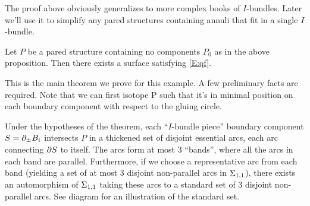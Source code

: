 The proof above obviously generalizes to more complex books of $I$-bundles.
Later we'll use it to simplify any pared structures containing annuli that fit
in a single $I$-bundle.

\begin{thm}\label{T:ex1}

Let $P$ be a pared structure containing no components $P_0$ as in the above
proposition. Then there exists a surface satisfying \eqref{E:qf}.

\end{thm}

This is the main theorem we prove for this example. A few preliminary facts are
required. Note that we can first isotope P such that it's in minimal position
on each boundary component with respect to the gluing circle.

\begin{lemma}

Under the hypotheses of the theorem, each ``$I$-bundle piece'' boundary
component $S=\partial_\pm B_i$ intersects $P$ in a thickened set of disjoint
essential arcs, each arc connecting $\partial S$ to itself. The arcs form at most
3 ``bands'', where all the arcs in each band are parallel.  Furthermore, if we
choose a representative arc from each band (yielding a set of at most
3 disjoint non-parallel arcs in $\Sigma_{1,1}$), there exists an automorphism of
$\Sigma_{1,1}$ taking these arcs to a standard set of 3 disjoint non-parallel
arcs.  See diagram for an illustration of the standard set.

\end{lemma}
